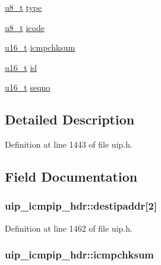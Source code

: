 \begin{DoxyCompactItemize}
\item 
\hyperlink{group__uipfw_ga4caecabca98b43919dd11be1c0d4cd8e}{u8\_\-t} \hyperlink{structuip__icmpip__hdr_afa0fe6ca88f692d22af70ff007411252}{type}
\item 
\hyperlink{group__uipfw_ga4caecabca98b43919dd11be1c0d4cd8e}{u8\_\-t} \hyperlink{structuip__icmpip__hdr_a266ea23d75c83f15b915ce54100e51c5}{icode}
\item 
\hyperlink{group__uipfw_ga77570ac4fcab86864fa1916e55676da2}{u16\_\-t} \hyperlink{structuip__icmpip__hdr_a805f8fd5533a6d4b6793e0645005da4c}{icmpchksum}
\item 
\hyperlink{group__uipfw_ga77570ac4fcab86864fa1916e55676da2}{u16\_\-t} \hyperlink{structuip__icmpip__hdr_aa6d51f3fa5da9b7f9cd37ae69600c04a}{id}
\item 
\hyperlink{group__uipfw_ga77570ac4fcab86864fa1916e55676da2}{u16\_\-t} \hyperlink{structuip__icmpip__hdr_a967def494c68cfc8a08d5a6c4dbbc25d}{seqno}
\end{DoxyCompactItemize}


\subsection{Detailed Description}


Definition at line 1443 of file uip.h.



\subsection{Field Documentation}
\hypertarget{structuip__icmpip__hdr_ae27f4949613fe3c1de5a839af01d99dd}{
\subsubsection[{destipaddr}]{ {\bf uip\_\-icmpip\_\-hdr::destipaddr}\mbox{[}2\mbox{]}}}
\label{structuip__icmpip__hdr_ae27f4949613fe3c1de5a839af01d99dd}


Definition at line 1462 of file uip.h.

\hypertarget{structuip__icmpip__hdr_a805f8fd5533a6d4b6793e0645005da4c}{
\subsubsection[{icmpchksum}]{ {\bf uip\_\-icmpip\_\-hdr::icmpchksum}}}
\label{structuip__icmpip__hdr_a805f8fd5533a6d4b6793e0645005da4c}



